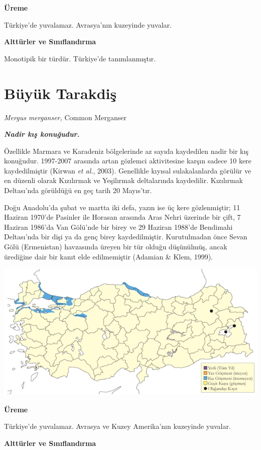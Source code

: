 \documentclass[
  a4paper,
  DIV=11,
  numbers=noendperiod]{scrreprt}
\begin{document}
\textbf{Üreme}

Türkiye'de yuvalamaz. Avrasya'nın kuzeyinde yuvalar.

\textbf{Alttürler ve Sınıflandırma}

Monotipik bir türdür. Türkiye'de tanımlanmıştır.

\section{Büyük Tarakdiş}\label{buxfcyuxfck-tarakdiux15f}

\emph{Mergus merganser,} Common Merganser

\textbf{\emph{Nadir kış konuğudur.}}

Özellikle Marmara ve Karadeniz bölgelerinde az sayıda kaydedilen nadir
bir kış konuğudur. 1997-2007 arasında artan gözlemci aktivitesine karşın
sadece 10 kere kaydedilmiştir (Kirwan \emph{et al.}, 2003). Genellikle
kıyısal sulakalanlarda görülür ve en düzenli olarak Kızılırmak ve
Yeşilırmak deltalarında kaydedilir. Kızılırmak Deltası'nda görüldüğü en
geç tarih 20 Mayıs'tır.

Doğu Anadolu'da şubat ve martta iki defa, yazın ise üç kere
gözlenmiştir; 11 Haziran 1970'de Pasinler ile Horasan arasında Aras
Nehri üzerinde bir çift, 7 Haziran 1986'da Van Gölü'nde bir birey ve 29
Haziran 1988'de Bendimahi Deltası'nda bir dişi ya da genç birey
kaydedilmiştir. Kurutulmadan önce Sevan Gölü (Ermenistan) havzasında
üreyen bir tür olduğu düşünülmüş, ancak ürediğine dair bir kanıt elde
edilmemiştir (Adamian \& Klem, 1999).

\includegraphics{images/harita_Page_033.png}

\textbf{Üreme}

Türkiye'de yuvalamaz. Avrasya ve Kuzey Amerika'nın kuzeyinde yuvalar.

\textbf{Alttürler ve Sınıflandırma}
\end{document}
